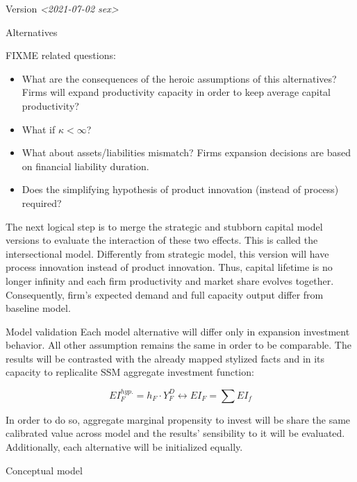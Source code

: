 \documentclass[presentation]{beamer}
\begin{document}
\begin{frame}[label={sec:org60efa21}]{Version \textit{<2021-07-02 sex>}}
\begin{block}{Alternatives}
\begin{info}
FIXME related questions:
\begin{itemize}
\item What are the consequences of the heroic assumptions of this alternatives? Firms will expand productivity capacity in order to keep average capital productivity?
\item What if \(\kappa < \infty\)?
\item What about assets/liabilities mismatch? Firms expansion decisions are based on financial liability duration.
\item Does the simplifying hypothesis of product innovation (instead of process) required?
\end{itemize}
\end{info}

The next logical step is to merge the \alert{strategic} and \alert{stubborn capital} model versions to evaluate the interaction of these two effects.
This is called the \alert{intersectional model}.
Differently from \alert{strategic model}, this version will have process innovation instead of product innovation.
Thus, capital lifetime is no longer infinity and each firm productivity and market share evolves together.
Consequently, firm's expected demand and full capacity output differ from baseline model.
\end{block}

\begin{block}{Model validation}
Each model alternative will differ only in expansion investment behavior.
All other assumption remains the same in order to  be comparable.
The results will be contrasted with the already mapped stylized facts and in its capacity to replicalite SSM aggregate investment function:

\begin{latex}
\begin{equation}
EI_{F}^{hyp.} = h_{F}\cdot Y^{D}_{F} \leftrightarrow EI_{F} = \sum EI_{f}
\end{equation}
\end{latex}
In order to do so, aggregate marginal propensity to invest will be share the same calibrated value across model and the results' sensibility to it will be evaluated.
Additionally, each alternative will be initialized equally.
\end{block}

\begin{block}{Conceptual model}
\end{block}
\end{frame}
\end{document}
